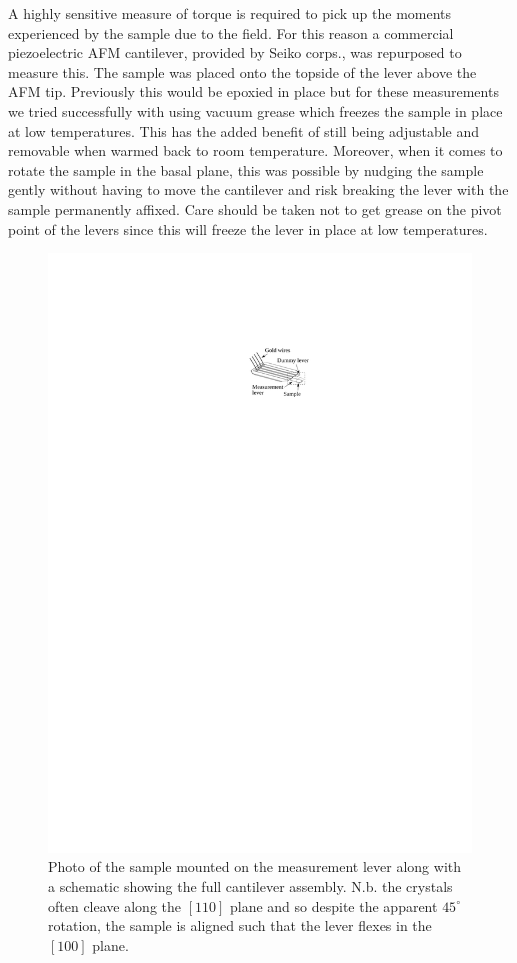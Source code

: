 A highly sensitive measure of torque is required to pick up the moments experienced by the sample due to the field. For this reason a commercial piezoelectric \ac{AFM} cantilever, provided by Seiko corps., was repurposed to measure this. The sample was placed onto the topside of the lever above the \ac{AFM} tip. Previously this would be epoxied in place but for these measurements we tried successfully with using vacuum grease which freezes the sample in place at low temperatures. This has the added benefit of still being adjustable and removable when warmed back to room temperature. Moreover, when it comes to rotate the sample in the basal plane, this was possible by nudging the sample gently without having to move the cantilever and risk breaking the lever with the sample permanently affixed. Care should be taken not to get grease on the pivot point of the levers since this will freeze the lever in place at low temperatures.
\begin{figure}[htbp]
    \begin{center}
        \includegraphics[scale=1.1]{Chapter-ExperimentalTechnique/Figures/CantileverSchematic/CantileverSchematic}
        \caption{Photo of the \BaFeP{} sample mounted on the measurement lever along with a schematic showing the full cantilever assembly. N.b. the \BaFeP{} crystals often cleave along the $[110]$ plane and so despite the apparent $45^\circ$ rotation, the sample is aligned such that the lever flexes in the $[100]$ plane.}
        \label{Fig:Exp:CantileverSchematic}
    \end{center}
\end{figure}
